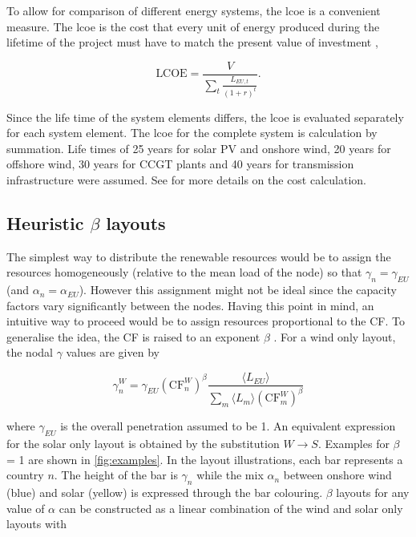 \documentclass[a4paper, 5p, sort&compress]{elsarticle}%
\newcommand{\paren}[1]{\left(#1\right)}
\begin{document}
To allow for comparison of different energy systems, the \gls{lcoe} is a convenient measure. The \gls{lcoe} is the
cost that every unit of energy produced during the lifetime of the
project must have to match the present value of investment
\cite{Short1995},

\begin{equation}
  \label{eq:7}
  \text{LCOE} = \frac{V}{\sum_{t} \frac{L_{EU,
        t}}{\paren{1+r}^{t}}} .
\end{equation}

Since the life time of the system elements differs, the \gls{lcoe} is
evaluated separately for each system element. The \gls{lcoe} for the
complete system is calculation by summation. Life times of 25 years
for solar PV and onshore wind, 20 years for offshore wind, 30 years
for CCGT plants and 40 years for transmission infrastructure were
assumed. See \cite{Sensitivity} for more details on the cost
calculation.

\subsection{Heuristic $\beta$ layouts}
\label{sec:beta-layout}

The simplest way to distribute the renewable resources would be to
assign the resources homogeneously (relative to the mean load of the
node) so that $\gamma_{n} = \gamma_{EU}$ (and $\alpha_{n} = \alpha_{EU}$). However this assignment
might not be ideal since the capacity factors vary significantly
between the nodes. Having this point in mind, an intuitive way to
proceed would be to assign resources proportional to the CF. To
generalise the idea, the CF is raised to an exponent $\beta$ %
\cite{Rolando}. For a wind only layout, the nodal $\gamma$ values are given by

\begin{equation}
  \label{eq:8}
  \gamma_{n}^{W} = \gamma_{EU} \paren{\text{CF}^{W}_{n}}^{\beta} \frac{\langle L_{EU}
    \rangle}{\sum_{m} \langle L_{m}
    \rangle \paren{\text{CF}^{W}_{m}}^{\beta}}
\end{equation}

where $\gamma_{EU}$ is the overall penetration assumed to be 1. An equivalent
expression for the solar only layout is obtained by the substitution
$W \to S$. Examples for $\beta$ = 1 are shown in \cref{fig:examples}. In
the layout illustrations, each bar represents a country $n$. The
height of the bar is $\gamma_{n}$ while the mix $\alpha_{n}$ between onshore
wind (blue) and solar (yellow) is expressed through the bar
colouring. $\beta$ layouts for any value of $\alpha$ can be constructed as a
linear combination of the wind and solar only layouts with
\end{document}
